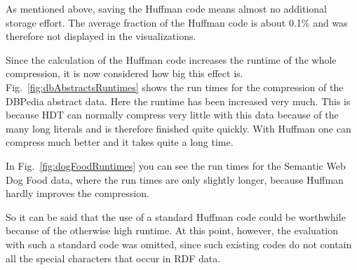 As mentioned above, saving the Huffman code means almost no additional storage effort. The average fraction of the Huffman code is about 0.1\% and was therefore not displayed in the visualizations.


Since the calculation of the Huffman code increases the runtime of the whole compression, it is now considered how big this effect is. Fig.~\ref{fig:dbAbstractsRuntimes} shows the run times for the compression of the DBPedia abstract data. Here the runtime has been increased very much. This is because HDT can normally compress very little with this data because of the many long literals and is therefore finished quite quickly. With Huffman one can compress much better and it takes quite a long time.

In Fig.~\ref{fig:dogFoodRuntimes} you can see the run times for the Semantic Web Dog Food data, where the run times are only slightly longer, because Huffman hardly improves the compression.

So it can be said that the use of a standard Huffman code could be worthwhile because of the otherwise high runtime. At this point, however, the evaluation with such a standard code was omitted, since such existing codes do not contain all the special characters that occur in RDF data.


